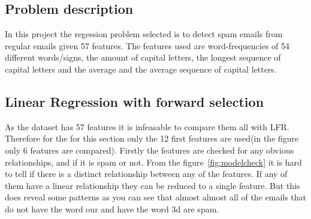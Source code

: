 \documentclass[11pt, paper=a4]{article}
\begin{document}
\subsection{Problem description}
In this project the regession problem selected is to detect spam
emails from regular emails given 57 features.  The features used are
word-frequencies of 54 different words/signs, the amount of capital
letters, the longest sequence of capital letters and the average and
the average sequence of capital letters.

\subsection{Linear Regression with forward selection}
As the dataset has 57 features it is infeasable to compare them all
with LFR. Therefore for the for this section only the 12 first
features are used(in the figure only 6 features are compared). Firstly
the features are checked for any obvious relationships, and if it is
spam or not. From the figure~\ref{fig:modelcheck} it is hard to tell
if there is a distinct relationship between any of the features. If
any of them have a linear relationship they can be reduced to a single
feature. But this does reveal some patterns as you can see that almost
almost all of the emails that do not have the word our and have the
word 3d are spam.
\end{document}
